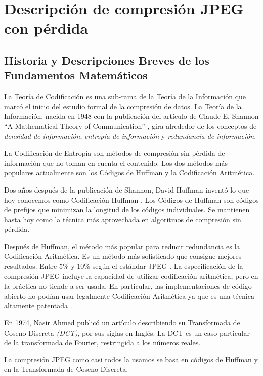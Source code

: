 \chapter{Descripción de compresión JPEG con pérdida}\label{ch:jpeg_desc}

\section{Historia y Descripciones Breves de los Fundamentos Matemáticos}

La Teoría de Codificación es una sub-rama de la Teoría de la Información que
marcó el inicio del estudio formal de la compresión de datos. La Teoría de la
Información, nacida en 1948 con la publicación del artículo de Claude E.
Shannon ``A Mathematical Theory of Communication'' \cite{shannon}, gira
alrededor de los conceptos de \emph{densidad de información}, \emph{entropía de
información} y \emph{redundancia de información}.

La Codificación de Entropía son métodos de compresión sin pérdida de
información que no toman en cuenta el contenido. Los dos métodos más populares
actualmente son los Códigos de Huffman y la Codificación Aritmética.

Dos años después de la publicación de Shannon, David Huffman inventó lo que hoy
conocemos como Codificación Huffman \cite{Huffman}. Los Códigos de Huffman son
códigos de prefijos que minimizan la longitud de los códigos individuales. Se
mantienen hasta hoy como la técnica más aprovechada en algoritmos de compresión
sin pérdida.

Después de Huffman, el método más popular para reducir redundancia es la
Codificación Aritmética. Es un método más sofisticado que consigue mejores
resultados. Entre $5\%$ y $10\%$ según el estándar JPEG \cite{jpeg-spec}. La
especificación de la compresión JPEG incluye la capacidad de utilizar
codificación aritmética, pero en la práctica no tiende a ser usada. En
particular, las implementaciones de código abierto no podían usar legalmente
Codificación Aritmética ya que es una técnica altamente patentada
\cite{jpeg_patents}.

En 1974, Nasir Ahmed publicó un artículo describiendo su Transformada de Coseno
Discreta \emph{(DCT)}, por sus siglas en Inglés. La DCT es un caso particular
de la transformada de Fourier, restringida a los números reales.

La compresión JPEG como casi todos la usamos se basa en códigos de Huffman y en
la Transformada de Coseno Discreta.

